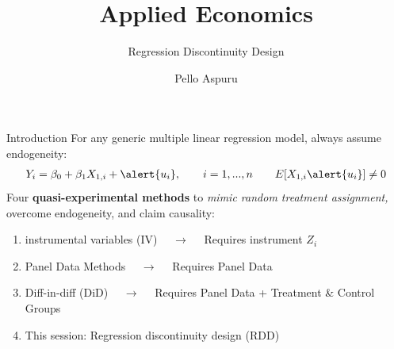 \documentclass[11pt, aspectratio = 169]{beamer}
\title{Applied Economics}
\subtitle{Regression Discontinuity Design}
\author{Pello Aspuru}
\date{}
\institute{Winter 2025/26}
\begin{document}
%
	
	\maketitle
	

\begin{frame}{Introduction}
For any generic multiple linear regression model, always assume endogeneity:
\begin{align*}
       Y_{i} = \beta_0 + \beta_1 X_{1,i} + \alert{u_{i}}, \quad \quad i = 1, ... , n
	   \quad \quad E[X_{1,i} \alert{u_{i}}] \neq 0 
\end{align*}    
\pause
Four \color{teal}\textbf{quasi-experimental methods} \color{black}to \textit{mimic random treatment assignment,} overcome endogeneity, and claim \alert{causality}: 
\begin{enumerate}
    \item instrumental variables (IV) $\quad \rightarrow \quad$ Requires instrument $Z_{i}$
    \item Panel Data Methods $\quad \rightarrow \quad$ Requires Panel Data
    \item Diff-in-diff (DiD) $\quad \rightarrow \quad$ Requires Panel Data + Treatment \& Control Groups
    \item This session: \alert{Regression discontinuity design (RDD)}
\end{enumerate}

\pause

\end{frame}
	
\end{document}
